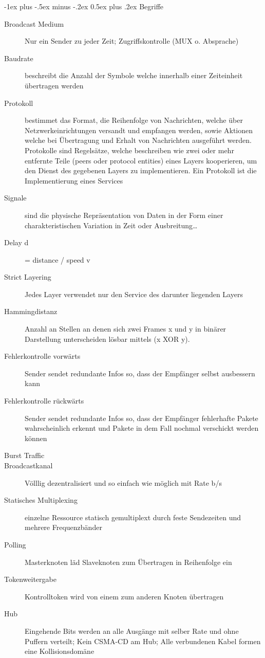 \documentclass[10pt,landscape]{article}
\makeatletter
\renewcommand{\section}{\@startsection{section}{1}{0mm}%
                                {-1ex plus -.5ex minus -.2ex}%
                                {0.5ex plus .2ex}%
                                {\normalfont\large\bfseries}}
\makeatother
\begin{document}
\begin{multicols}{3}
\section{Begriffe}
\begin{description}
    \item[Broadcast Medium] Nur ein Sender zu jeder Zeit; Zugriffskontrolle (MUX o. Absprache)
    \item[Baudrate] beschreibt die Anzahl der Symbole welche innerhalb einer Zeiteinheit übertragen werden
    \item[Protokoll] bestimmet das Format, die Reihenfolge von Nachrichten, welche über Netzwerkeinrichtungen versandt und empfangen werden, sowie Aktionen welche bei Übertragung und Erhalt von Nachrichten ausgeführt werden. Protokolle sind Regelsätze, welche beschreiben wie zwei oder mehr entfernte Teile (peers oder protocol entities) eines Layers kooperieren, um den Dienst des gegebenen Layers zu implementieren. Ein Protokoll ist die Implementierung eines Services
    \item[Signale] sind die physische Repräsentation von Daten in der Form einer charakteristischen Variation in Zeit oder Ausbreitung…
    \item[Delay d] = distance / speed v
    \item[Strict Layering] Jedes Layer verwendet nur den Service des darunter liegenden Layers
    \item[Hammingdistanz] Anzahl an Stellen an denen sich zwei Frames x und y in binärer Darstellung unterscheiden lösbar mittels (x XOR y). 
    \item[Fehlerkontrolle vorwärts] Sender sendet redundante Infos so, dass der Empfänger selbst ausbessern kann
    \item[Fehlerkontrolle rückwärts] Sender sendet redundante Infos so, dass der Empfänger fehlerhafte Pakete wahrscheinlich erkennt und Pakete in dem Fall nochmal verschickt werden können
    \item[Burst Traffic]
    \item[Broadcastkanal] Völllig dezentralisiert und so einfach wie möglich mit Rate b/s 
    \item[Statisches Multiplexing] einzelne Ressource statisch gemultiplext durch feste Sendezeiten und mehrere Frequenzbänder
    \item[Polling] Masterknoten läd Slaveknoten zum Übertragen in Reihenfolge ein
    \item[Tokenweitergabe] Kontrolltoken wird von einem zum anderen Knoten übertragen
    \item[Hub] Eingehende Bits werden an alle Ausgänge mit selber Rate und ohne Puffern verteilt; Kein CSMA-CD am Hub; Alle verbundenen Kabel formen eine Kollisionsdomäne

\end{description}
\end{multicols}
\end{document}
